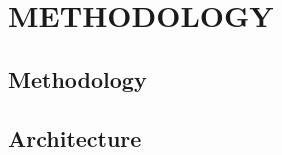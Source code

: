 \documentclass[main]{subfiles}
\begin{document}
\chapter{\MakeUppercase{ Methodology}}

\section{Methodology}
\section{Architecture}
\end{document}
